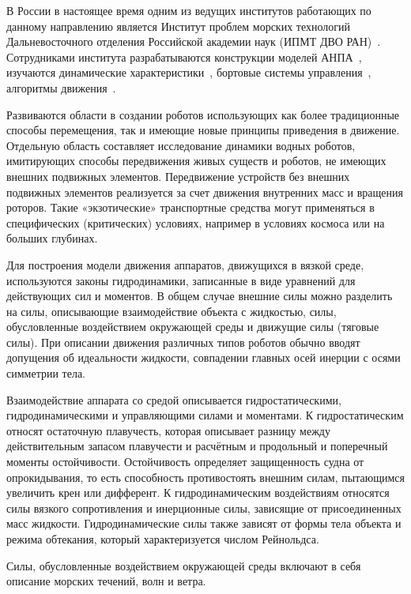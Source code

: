 В России в настоящее время одним из ведущих институтов работающих по данному направлению является Институт проблем морских технологий Дальневосточного отделения Российской академии наук (ИПМТ ДВО РАН)~\cite{Ageev, Kiselev_2012}. Сотрудниками института разрабатываются конструкции моделей АНПА~\cite{Boreyko_2011, Iznarcev_2007}, изучаются динамические характеристики~\cite{Kiselev_2012}, бортовые системы управления~\cite{Iznarcev_2005}, алгоритмы движения~\cite{Kiselev_2004}.



Развиваются области в создании роботов использующих как более традиционные способы перемещения, так и имеющие новые принципы приведения в движение. Отдельную область составляет исследование динамики водных роботов, имитирующих способы передвижения живых существ и роботов, не имеющих внешних подвижных элементов. Передвижение устройств без внешних подвижных элементов реализуется за счет движения внутренних масс и вращения роторов. Такие «экзотические» транспортные средства могут применяться в специфических (критических) условиях, например в условиях космоса или на больших глубинах.

Для построения модели движения аппаратов, движущихся в вязкой среде, используются законы гидродинамики, записанные в виде уравнений для действующих сил и моментов. В общем случае внешние силы можно разделить на силы, описывающие взаимодействие объекта с жидкостью, силы, обусловленные воздействием окружающей среды и движущие силы (тяговые силы). При описании движения различных типов роботов обычно вводят допущения об идеальности жидкости, совпадении главных осей инерции с осями симметрии тела.

Взаимодействие аппарата со средой описывается гидростатическими, гидродинамическими и управляющими силами и моментами. К гидростатическим относят остаточную плавучесть, которая описывает разницу между действительным запасом плавучести и расчётным и продольный и поперечный моменты остойчивости. Остойчивость определяет защищенность судна от опрокидывания, то есть способность противостоять внешним силам, пытающимся увеличить крен или дифферент. К гидродинамическим воздействиям относятся силы вязкого сопротивления и инерционные силы, зависящие от присоединенных масс жидкости. Гидродинамические силы также зависят от формы тела объекта и режима обтекания, который характеризуется числом Рейнольдса.

Силы, обусловленные воздействием окружающей среды включают в себя описание морских течений, волн и ветра.

